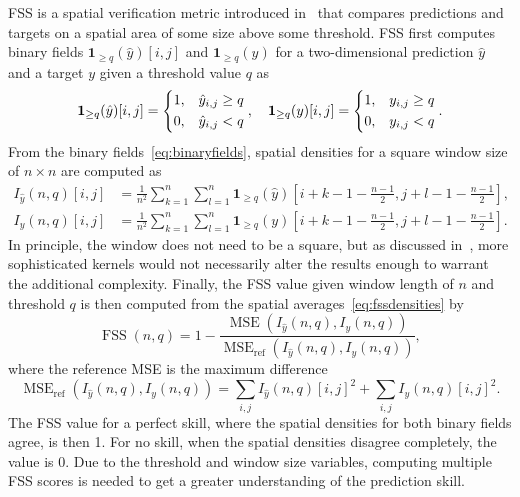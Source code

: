 FSS is a spatial verification metric introduced in~\cite{fss} that compares predictions and targets on a spatial area of some size above some threshold.
FSS first computes binary fields $\bm{1}_{\geq q}(\hat{y})[i,j]$ and $\bm{1}_{\geq q}(y)$ for a two-dimensional prediction $\hat{y}$ and a target $y$ given a threshold value $q$ as
\begin{equation}\label{eq:binaryfields}
    \bm{1}_{\geq q}(\hat{y})[i,j] = 
        \begin{dcases}
            1, &\hat{y}_{i,j} \geq q\\
            0, &\hat{y}_{i,j} < q
        \end{dcases}, \quad
        \bm{1}_{\geq q}(y)[i,j] = 
        \begin{dcases}
            1, &y_{i,j} \geq q\\
            0, &y_{i,j} < q
        \end{dcases}.
\end{equation}
From the binary fields~\eqref{eq:binaryfields}, spatial densities for a square window size of $n \times n$ are computed as
\begin{subequations}\label{eq:fssdensities}
    \begin{align}
        I_{\hat{y}}(n,q)[i,j] &= \frac{1}{n^2} \sum_{k=1}^{n}\sum_{l=1}^{n} \bm{1}_{\geq q}(\hat{y}) \left[i+k-1- \frac{n-1}{2}, j+l-1-\frac{n-1}{2} \right],\\
        I_{y}(n,q)[i,j] &= \frac{1}{n^2} \sum_{k=1}^{n}\sum_{l=1}^{n} \bm{1}_{\geq q}(y) \left[i+k-1- \frac{n-1}{2}, j+l-1-\frac{n-1}{2} \right].
    \end{align}
\end{subequations}
In principle, the window does not need to be a square, but as discussed in~\cite{fss}, more sophisticated kernels would not necessarily alter the results enough to warrant the additional complexity.
Finally, the FSS value given window length of $n$ and threshold $q$ is then computed from the spatial averages~\eqref{eq:fssdensities} by
\begin{equation*}
    \operatorname{FSS}(n,q) = 1 - \frac{\operatorname{MSE}\left(I_{\hat{y}}(n,q), I_{y}(n,q)\right)}{\operatorname{MSE}_{\text{ref}}\left(I_{\hat{y}}(n,q), I_{y}(n,q)\right)},
\end{equation*}
where the reference MSE is the maximum difference 
\begin{equation*}
    \operatorname{MSE}_{\text{ref}}\left(I_{\hat{y}}(n,q), I_{y}(n,q)\right) = \sum_{i,j}I_{\hat{y}}(n,q)[i,j]^2 + \sum_{i,j}I_{y}(n,q)[i,j]^2.
\end{equation*}
The FSS value for a perfect skill, where the spatial densities for both binary fields agree, is then 1.
For no skill, when the spatial densities disagree completely, the value is 0.
Due to the threshold and window size variables, computing multiple FSS scores is needed to get a greater understanding of the prediction skill.

